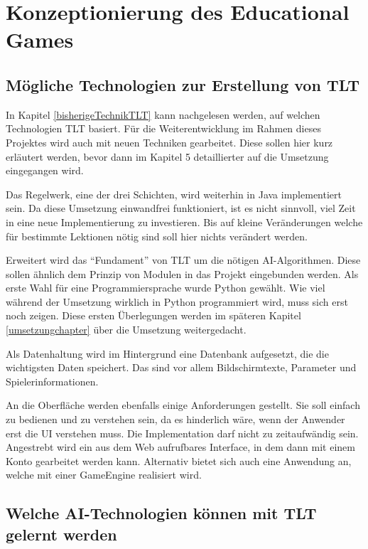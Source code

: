 \chapter{Konzeptionierung des Educational Games}

\section{Mögliche Technologien zur Erstellung von TLT}

In Kapitel \ref{bisherigeTechnikTLT} kann nachgelesen werden, auf welchen Technologien TLT basiert. Für die Weiterentwicklung im Rahmen dieses Projektes wird auch mit neuen Techniken gearbeitet. Diese sollen hier kurz erläutert werden, bevor dann im Kapitel 5 detaillierter auf die Umsetzung eingegangen wird. 

Das Regelwerk, eine der drei Schichten, wird weiterhin in Java implementiert sein. Da diese Umsetzung einwandfrei funktioniert, ist es nicht sinnvoll, viel Zeit in eine neue Implementierung zu investieren. Bis auf kleine Veränderungen welche für bestimmte Lektionen nötig sind soll hier nichts verändert werden. 

Erweitert wird das "`Fundament"' von TLT um die nötigen AI-Algorithmen. Diese sollen ähnlich dem Prinzip von Modulen in das Projekt eingebunden werden. Als erste Wahl für eine Programmiersprache wurde Python gewählt. Wie viel während der Umsetzung wirklich in Python programmiert wird, muss sich erst noch zeigen. Diese ersten Überlegungen werden im späteren Kapitel \ref{umsetzungchapter} über die Umsetzung weitergedacht.

Als Datenhaltung wird im Hintergrund eine Datenbank aufgesetzt, die die wichtigsten Daten speichert. Das sind vor allem Bildschirmtexte, Parameter und Spielerinformationen. 

An die Oberfläche werden ebenfalls einige Anforderungen gestellt. Sie soll einfach zu bedienen und zu verstehen sein, da es hinderlich wäre, wenn der Anwender erst die UI verstehen muss. Die Implementation darf nicht zu zeitaufwändig sein. Angestrebt wird ein aus dem Web aufrufbares Interface, in dem dann mit einem Konto gearbeitet werden kann. Alternativ bietet sich auch eine Anwendung an, welche mit einer GameEngine realisiert wird.

\section{Welche AI-Technologien können mit TLT gelernt werden}
\label{lernbareTechnologien}

